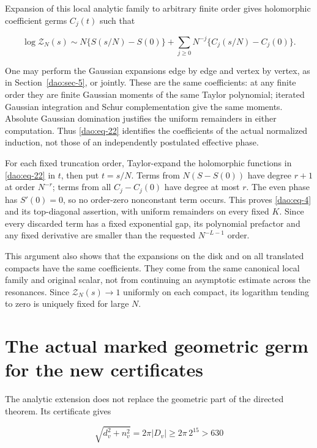 Expansion of this local analytic family to arbitrary finite order gives holomorphic coefficient germs \(C_j(t)\) such that

\begin{equation}\label{dao:eq-22}
\log\mathcal Z_N(s)\sim
 N\{S(s/N)-S(0)\}
       +\sum_{j\ge0}N^{-j}\{C_j(s/N)-C_j(0)\}.
\end{equation}

One may perform the Gaussian expansions edge by edge and vertex by vertex, as in Section~\ref{dao:sec-5}, or jointly. These are the same coefficients: at any finite order they are finite Gaussian moments of the same Taylor polynomial; iterated Gaussian integration and Schur complementation give the same moments. Absolute Gaussian domination justifies the uniform remainders in either computation. Thus \eqref{dao:eq-22} identifies the coefficients of the actual normalized induction, not those of an independently postulated effective phase.

For each fixed truncation order, Taylor-expand the holomorphic functions in \eqref{dao:eq-22} in \(t\), then put \(t=s/N\). Terms from \(N(S-S(0))\) have degree \(r+1\) at order \(N^{-r}\); terms from all \(C_j-C_j(0)\) have degree at most \(r\). The even phase has \(S'(0)=0\), so no order-zero nonconstant term occurs. This proves \eqref{dao:eq-4} and its top-diagonal assertion, with uniform remainders on every fixed \(K\). Since every discarded term has a fixed exponential gap, its polynomial prefactor and any fixed derivative are smaller than the requested \(N^{-L-1}\) order.

This argument also shows that the expansions on the disk and on all translated compacts have the same coefficients. They come from the same canonical local family and original scalar, not from continuing an asymptotic estimate across the resonances. Since \(\mathcal Z_N(s)\to1\) uniformly on each compact, its logarithm tending to zero is uniquely fixed for large \(N\).

\section{The actual marked geometric germ for the new certificates}\label{dao:sec-7}

The analytic extension does not replace the geometric part of the directed theorem. Its certificate gives

\begin{equation}\label{dao:eq-23}
\sqrt{d_v^2+n_v^2}=2\pi|D_v|\ge2\pi\,2^{15}>630
\end{equation}

